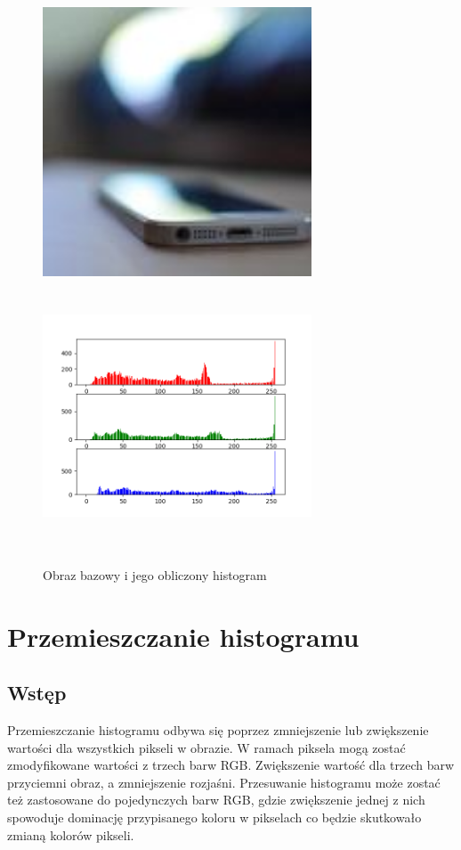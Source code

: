 \documentclass[a4paper,12pt]{book}
\begin{document}
\begin{figure}[H]
	\caption{Obraz bazowy i jego obliczony histogram}
	\includegraphics[width=8cm, height=8cm]{phone-unmodified.jpg}
	\includegraphics[width=8cm, height=8cm]{6-1/calculate-phone.png}
\end{figure}

\section{Przemieszczanie histogramu}
\subsection*{Wstęp}
Przemieszczanie histogramu odbywa się poprzez zmniejszenie lub zwiększenie wartości dla wszystkich pikseli w obrazie. W ramach piksela mogą zostać zmodyfikowane wartości z trzech barw RGB. Zwiększenie wartość dla trzech barw przyciemni obraz, a zmniejszenie rozjaśni. Przesuwanie histogramu może zostać też zastosowane do pojedynczych barw RGB, gdzie zwiększenie jednej z nich spowoduje dominację przypisanego koloru w pikselach co będzie skutkowało zmianą kolorów pikseli. 
\end{document}
